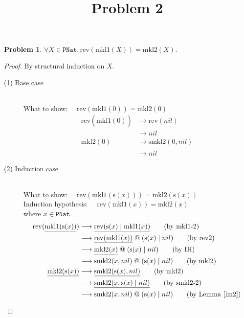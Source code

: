 \documentclass[12pt, a4paper]{article}
\title{Problem 2}
\date{\vspace{-5ex}}
\newtheorem{problem}{Problem}
\newcommand{\rel}[1]{\mathrel{#1}}
\newcommand{\rmx}[1]{\mathrm{#1}}
\newcommand{\larrow}{\longrightarrow}
\newcommand{\under}{\underline}
\begin{document}
\maketitle

\begin{problem}
$\forall X \in \mathtt{PNat}, \rmx{rev}(\rmx{mkl1}(X)) = \rmx{mkl2}(X)$.
\end{problem}
\begin{proof}
By structural induction on $X$.

\begin{description}

\item[(1) Base case]~\\
\noindent
What to show: $\quad\rmx{rev}(\rmx{mkl1}(0)) = \rmx{mkl2}(0)$
\begin{align*}
\rmx{rev}(\under{\rmx{mkl1}(0)}) &\larrow \under{\rmx{rev}(nil)} \tag{by mkl1-1} \\
	&\larrow nil \tag{by rev1} \\
\under{\rmx{mkl2}(0)} &\larrow \under{\rmx{smkl2}(0, nil)} \tag{by mkl2} \\
	&\larrow nil \tag{by smkl2-1}
\end{align*}

\item[(2) Induction case]~\\
What to show: $\quad\rmx{rev}(\rmx{mkl1}(\rmx{s}(x))) = \rmx{mkl2}(\rmx{s}(x))$ \\
Induction hypothesis: $\quad \rmx{rev}(\rmx{mkl1}(x)) = \rmx{mkl2}(x)$ \\
where $x \in \mathtt{PNat}$.
\begin{align*}
\rmx{rev}(\under{\rmx{mkl1}(\rmx{s}(x))}) 
	&\larrow \under{\rmx{rev}(\rmx{s}(x) \rel{|} \rmx{mkl1}(x))} \tag{by mkl1-2} \\
	&\larrow  \under{\rmx{rev}(\rmx{mkl1}(x))} \rel{@} (\rmx{s}(x) \rel{|} nil)  \tag{by rev2} \\
	&\larrow \under{\rmx{mkl2}(x)} \rel{@} (\rmx{s}(x) \rel{|} nil)  \tag{by IH} \\
	&\larrow \rmx{smkl2}(x, nil) \rel{@} (\rmx{s}(x) \rel{|} nil)  \tag{by mkl2} \\
\under{\rmx{mkl2}(\rmx{s}(x))} 
	&\larrow \under{\rmx{smkl2}(\rmx{s}(x), nil)} \tag{by mkl2} \\
	&\larrow \under{\rmx{smkl2}(x, \rmx{s}(x) \rel{|} nil)} \tag{by smkl2-2} \\
	&\larrow \rmx{smkl2}(x, nil) \rel{@} (\rmx{s}(x) \rel{|} nil) \tag{by Lemma~\ref{lm2}}
\end{align*}

\end{description}
\end{proof}
\end{document}

